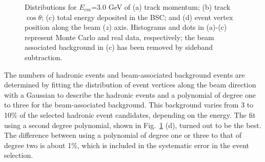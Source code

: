\begin{figure}[htb]
\epsfxsize=3.4in
\centerline{}
\caption{Distributions for $E_{cm}$=3.0 GeV of 
(a) track momentum;
(b) track $\cos \theta$; 
(c) total energy deposited in the BSC; and  
(d) event vertex position along the beam ($z$) axis. 
Histograms and dots in (a)-(c) represent Monte Carlo and real data, 
respectively; the beam associated background in (c) has been removed by
sideband subtraction.}
\label{fig:evtsel}
\end{figure}

The numbers of hadronic events and beam-associated background events
are determined by fitting the distribution of event vertices along the 
beam direction with a Gaussian to describe the hadronic events and a 
polynomial of degree one to three for the beam-associated background.
This background varies from 3 to 10\% 
of the selected hadronic event candidates, depending on the energy.    
The fit using a second degree polynomial, shown in Fig.~\ref{fig:evtsel} (d),
turned out to be the best.  The difference between 
using a polynomial of degree one or three 
to that of degree two is about 1\%, which is included in the systematic 
error in the event selection.    


